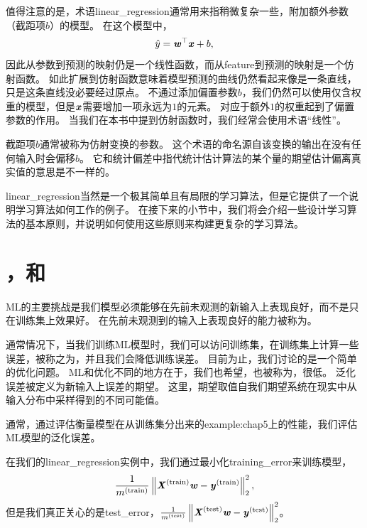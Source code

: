 值得注意的是，术语{\gls{linear_regression}}通常用来指稍微复杂一些，附加额外参数（截距项$b$）的模型。
在这个模型中，
\begin{equation}
    \hat{y} = \boldsymbol{\mathit{w}}^\top \boldsymbol{\mathit{x}} + b,
\end{equation}
因此从参数到预测的映射仍是一个线性函数，而从\gls{feature}到预测的映射是一个仿射函数。
如此扩展到仿射函数意味着模型预测的曲线仍然看起来像是一条直线，只是这条直线没必要经过原点。
不通过添加偏置参数$b$，我们仍然可以使用仅含权重的模型，但是$\boldsymbol{\mathit{x}}$需要增加一项永远为$1$的元素。
对应于额外$1$的权重起到了偏置参数的作用。
当我们在本书中提到仿射函数时，我们经常会使用术语“线性”。


截距项$b$通常被称为仿射变换的参数。
这个术语的命名源自该变换的输出在没有任何输入时会偏移$b$。
它和统计偏差中指代统计估计算法的某个量的期望估计偏离真实值的意思是不一样的。

\gls{linear_regression}当然是一个极其简单且有局限的学习算法，但是它提供了一个说明学习算法如何工作的例子。
在接下来的小节中，我们将会介绍一些设计学习算法的基本原则，并说明如何使用这些原则来构建更复杂的学习算法。

\section{，和}
\label{sec:capacity_overfitting_and_underfitting}
\gls{ML}的主要挑战是我们模型必须能够在先前未观测的新输入上表现良好，而不是只在训练集上效果好。
在先前未观测到的输入上表现良好的能力被称为。

通常情况下，当我们训练\gls{ML}模型时，我们可以访问训练集，在训练集上计算一些误差，被称之为，并且我们会降低训练误差。
目前为止，我们讨论的是一个简单的优化问题。
\gls{ML}和优化不同的地方在于，我们也希望，也被称为，很低。
泛化误差被定义为新输入上误差的期望。
这里，期望取值自我们期望系统在现实中从输入分布中采样得到的不同可能值。

通常，通过评估衡量模型在从训练集分出来的\gls{example:chap5}上的性能，我们评估\gls{ML}模型的泛化误差。

在我们的\gls{linear_regression}实例中，我们通过最小化\gls{training_error}来训练模型，
\begin{equation}
    \frac{1}{m^{(\text{train})}} \left\lVert\boldsymbol{\mathit{X}}^{(\text{train})}\boldsymbol{\mathit{w}} - \boldsymbol{\mathit{y}}^{(\text{train})}\right\rVert_2^2,
\end{equation}
但是我们真正关心的是\gls{test_error}，$\frac{1}{m^{(\text{test})}} \left\lVert\boldsymbol{\mathit{X}}^{(\text{test})}\boldsymbol{\mathit{w}} - \boldsymbol{\mathit{y}}^{(\text{test})}\right\rVert_2^2$。

